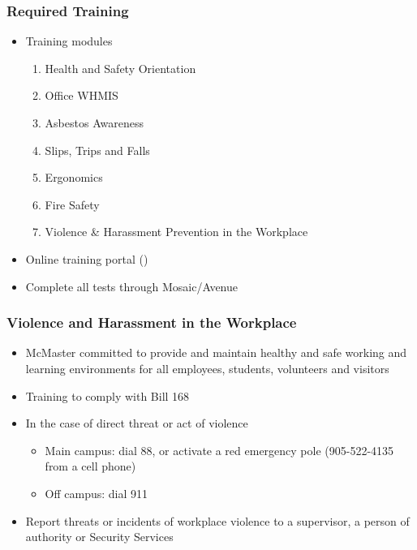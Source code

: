\documentclass[handout]{beamer} %
\begin{document}

\begin{frame}
\frametitle{Required Training}

\begin{itemize}
\item Training modules

\begin{enumerate}
\item Health and Safety Orientation
\item Office WHMIS
\item Asbestos Awareness
\item Slips, Trips and Falls
\item Ergonomics
\item Fire Safety
\item Violence \& Harassment Prevention in the Workplace
\end{enumerate}

\item Online training portal ()
\item Complete all tests through Mosaic/Avenue

\end{itemize}

\end{frame}


\begin{frame}
\frametitle{Violence and Harassment in the Workplace}

\begin{itemize}
\item McMaster committed to provide and maintain healthy and safe working and
  learning environments for all employees, students, volunteers and visitors
\item Training to comply with Bill 168
\item In the case of direct threat or act of violence
\begin{itemize}
\item Main campus: dial 88, or activate a red emergency pole (905-522-4135 from
  a cell phone)
\item Off campus: dial 911
\end{itemize}
\item Report threats or incidents of workplace violence to a supervisor, a
  person of authority or Security Services
\end{itemize}

\end{frame}
\end{document}
